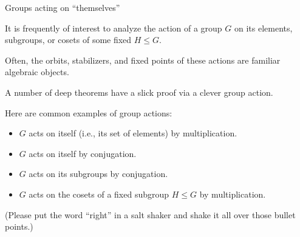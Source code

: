 \documentclass[8pt, handout]{beamer}
\newcommand{\Pause}{}      %
\begin{document}
\begin{frame}{Groups acting on ``themselves''} %
  
  It is frequently of interest to analyze the action of a group $G$ on
  its elements, subgroups, or cosets of some fixed $H\leq G$.
  
  \bigskip
  
  Often, the orbits, stabilizers, and fixed points of these actions
  are familiar algebraic objects.
  
  \bigskip
  
  A number of deep theorems have a slick proof via a clever group
  action.
  
  \bigskip
  
  Here are common examples of group actions: 
  
  \begin{itemize}
  \item $G$ acts on itself (i.e., its set of elements) by multiplication. 
  \item $G$ acts on itself by conjugation. 
  \item $G$ acts on its subgroups by conjugation. 
  \item $G$ acts on the cosets of a fixed subgroup $H\leq G$ by
    multiplication. 
  \end{itemize}

  \medskip

  (Please put the word ``right'' in a salt shaker and shake it all over those bullet points.)
  
\end{frame}

\end{document}
